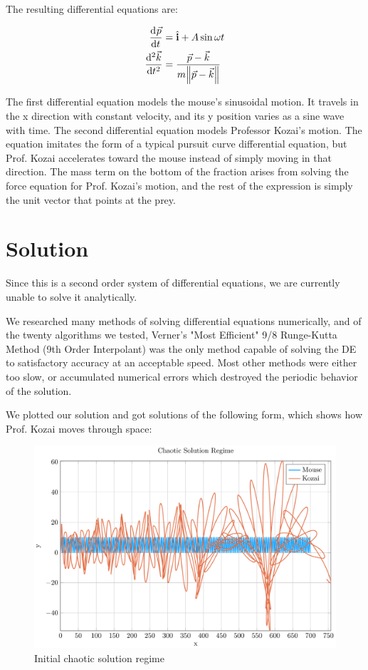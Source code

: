 \documentclass{article}
\begin{document}
\begin{multicols}{2}
  The resulting differential equations are:

  \begin{align*}
    \dod{\vec p}{t} &= \hat{\mathbf{i}} + A \sin \omega t\\
    \dod[2]{\vec k}{t} &= \frac{\vec p - \vec k}{m \norm{\vec p - \vec k}}
  \end{align*}

  The first differential equation models the mouse’s sinusoidal motion. It travels in the x direction with constant velocity, and its y position varies as a sine wave with time.
  The second differential equation models Professor Kozai’s motion. The equation imitates the form of a typical pursuit curve differential equation, but Prof. Kozai accelerates toward the mouse instead of simply moving in that direction. The mass term on the bottom of the fraction arises from solving the force equation for Prof. Kozai’s motion, and the rest of the expression is simply the unit vector that points at the prey.

  \section{Solution}
  Since this is a second order system of differential equations, we are currently unable to solve it analytically.

  We researched many methods of solving differential equations numerically, and of the twenty algorithms we tested, Verner's "Most Efficient" 9/8 Runge-Kutta Method (9th Order Interpolant) was the only method capable of solving the DE to satisfactory accuracy at an acceptable speed. Most other methods were either too slow, or accumulated numerical errors which destroyed the periodic behavior of the solution.

  We plotted our solution and got solutions of the following form, which shows how Prof. Kozai moves through space:

  \begin{figure}[H]
    \includegraphics[scale=0.2]{chaotic}
    \caption{Initial chaotic solution regime}
  \end{figure}


\end{multicols}
\end{document}

